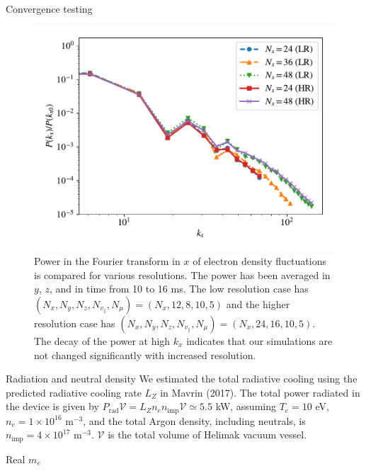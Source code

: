\documentclass[12pt,table]{beamer}
\begin{document}
\begin{frame}{Convergence testing}
    \begin{figure}
    \centering
    \includegraphics[width=.6\linewidth]{figs/kx-Nx-ths.pdf}
    \caption[Power in the Fourier transform in $x$ of electron density fluctuations compared for various resolutions.]{Power in the Fourier transform in $x$ of electron density fluctuations is compared for various resolutions. The power has been averaged in $y$, $z$, and in time from 10 to 16 ms. The low resolution case has $(N_x,N_y,N_z,N_{v_\parallel},N_\mu) = (N_x,12,8,10,5)$ and the higher resolution case has $(N_x,N_y,N_z,N_{v_\parallel},N_\mu) = (N_x,24,16,10,5)$. The decay of the power at high $k_x$ indicates that our simulations are not changed significantly with increased resolution.}
    \label{fig:kx-converge}
\end{figure}
\end{frame}

\begin{frame}{Radiation and neutral density}
    We estimated the total radiative cooling using the predicted radiative cooling rate $L_Z$ in Mavrin (2017). The total power radiated in the device is given by $P_{\text{rad}}\mathcal{V}= L_Z n_e n_{\text{imp}} \mathcal{V} \simeq 5.5$ kW, assuming $T_e = 10$ eV, $n_e=1 \times 10^{16}$ m$^{-3}$, and the total Argon density, including neutrals, is $n_{\text{imp}}=4 \times 10^{17}$ m$^{-3}$. $\mathcal{V}$ is the total volume of Helimak vacuum vessel.
\end{frame}

\begin{frame}{Real $m_e$}
    
\end{frame}
\end{document}
